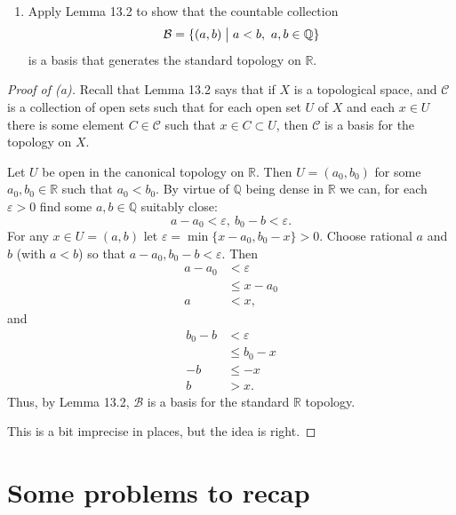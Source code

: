 \documentclass[11pt]{article}
\begin{document}
\begin{prob}[Problem 8]
    \medskip 
    \ 
    \begin{enumerate}[label=\alph*)]
        \item Apply Lemma 13.2 to show that the 
            countable collection 
            \[
                \mathcal B = \{(a,b) \bigm| a < b, \ a,b \in \mathbb Q\}
            \]
            is a basis that generates the standard topology on 
            $\mathbb R$.
    \end{enumerate}
\end{prob}
\begin{proof}[Proof of (a)]
    Recall that Lemma 13.2 says that if $X$ is a topological space, and 
    $\mathcal C$ is a collection of open sets such that for each 
    open set $U$ of $X$ and each $x \in U$ there is some element  
    $C \in \mathcal C$ such that $x \in C \subset U$, then $\mathcal C$ 
    is a basis for the topology on $X$.

    Let $U$ be open in the canonical topology on $\mathbb R$. Then 
    $U = (a_0,b_0)$ for some $a_0,b_0 \in \mathbb R$ such that 
    $a_0 < b_0$. By virtue of $\mathbb Q$ being dense in $\mathbb R$
    we can, for each $\varepsilon > 0$ find some $a,b \in \mathbb Q$ 
    suitably close: 
    \[
        a - a_0 < \varepsilon, \ b_0 - b < \varepsilon. 
    \]
    For any $x \in U = (a,b)$ let $\varepsilon = \min\{x - a_0, b_0-x\} > 0$. 
    Choose rational $a$ and $b$ (with $a < b$) so that 
    $a - a_0, b_0 - b < \varepsilon$. 
    Then 
    \begin{align*}
        a - a_0 &< \varepsilon \\ 
                &\leq x - a_0 \\ 
        a       &< x, 
    \end{align*}
    and 
    \begin{align*}
        b_0 - b &< \varepsilon \\
                &\leq b_0 - x \\ 
        -b      &\leq -x \\ 
        b       &> x. 
    \end{align*}
    Thus, by Lemma 13.2, $\mathcal B$ is a basis for the standard 
    $\mathbb R$ topology. 

    This is a bit imprecise in places, but the idea is right.
\end{proof}

\section{Some problems to recap}
\end{document}
